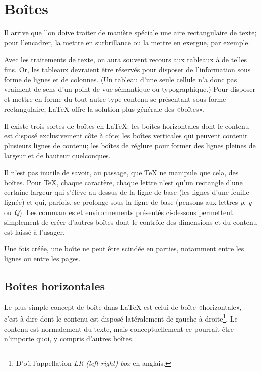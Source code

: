 \chapter{Boîtes}
\label{chap:boites}

Il arrive que l'on doive traiter de manière spéciale une aire
rectangulaire de texte; pour l'encadrer, la mettre en surbrillance ou
la mettre en exergue, par exemple.

Avec les traitements de texte, on aura souvent recours aux tableaux à
de telles fins. Or, les tableaux devraient être réservés pour disposer
de l'information sous forme de lignes et de colonnes. (Un tableau
d'une seule cellule n'a donc pas vraiment de sens d'un point de vue
sémantique ou typographique.) Pour disposer et mettre en forme du tout
autre type contenu se présentant sous forme rectangulaire, {\LaTeX}
offre la solution plus générale des «boîtes».

Il existe trois sortes de boîtes en {\LaTeX}: les boîtes horizontales
dont le contenu est disposé exclusivement côte à côte; les boîtes
verticales qui peuvent contenir plusieurs lignes de contenu; les
boîtes de réglure pour former des lignes pleines de largeur et de
hauteur quelconques.

Il n'est pas inutile de savoir, au passage, que {\TeX} ne manipule que
cela, des boîtes. Pour {\TeX}, chaque caractère, chaque lettre n'est
qu'un rectangle d'une certaine largeur qui s'élève au-dessus de la
ligne de base (les lignes d'une feuille lignée) et qui, parfois, se
prolonge sous la ligne de base (pensons aux lettres \emph{p}, \emph{y}
ou \emph{Q}). Les commandes et environnements présentés ci-dessous
permettent simplement de créer d'autres boîtes dont le contrôle des
dimensions et du contenu est laissé à l'usager.

Une fois créée, une boîte ne peut être scindée en parties, notamment
entre les lignes ou entre les pages.



\section{Boîtes horizontales}
\label{sec:boites:lrbox}

Le plus simple concept de boîte dans {\LaTeX} est celui de boîte
«horizontale», c'est-à-dire dont le contenu est disposé latéralement
de gauche à droite\footnote{%
  D'où l'appellation \emph{LR (left-right) box} en anglais.}. %
Le contenu est normalement du texte, mais conceptuellement ce pourrait
être n'importe quoi, y compris d'autres boîtes.

